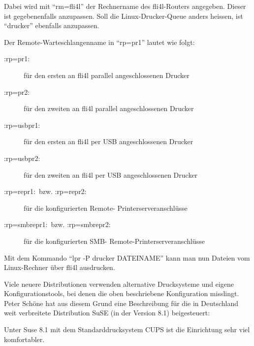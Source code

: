     Dabei wird mit ``rm=fli4l'' der Rechnername des fli4l-Routers angegeben.
    Dieser ist gegebenenfalls anzupassen. Soll die Linux-Drucker-Queue anders
    heissen, ist ``drucker'' ebenfalls anzupassen.

    Der Remote-Warteschlangenname in ``rp=pr1'' lautet wie folgt:

    \begin{description}
    \item[:rp=pr1:\ ] für den ersten an fli4l parallel angeschlossenen Drucker
    \item[:rp=pr2:\ ] für den zweiten an fli4l parallel angeschlossenen Drucker

    \item[:rp=usbpr1:\ ] für den ersten an fli4l per USB angeschlossenen Drucker
    \item[:rp=usbpr2:\ ] für den zweiten an fli4l per USB angeschlossenen Drucker

    \item[:rp=repr1:\ bzw. :rp=repr2:\ ] für die konfigurierten Remote-
    Printerserveranschlüsse

    \item[:rp=smbrepr1:\ bzw. :rp=smbrepr2:\ ] für die konfigurierten SMB-
    Remote-Printerserveranschlüsse

    \end{description}



    Mit dem Kommando ``lpr -P drucker DATEINAME'' kann man nun
    Dateien vom Linux-Rechner über fli4l ausdrucken.

Viele neuere Distributionen verwenden alternative Drucksysteme und eigene
Konfigurationstools, bei denen die oben beschriebene Konfiguration misslingt.
Peter Schöne hat aus diesem Grund eine Beschreibung für die in Deutschland weit
verbreitete Distribution SuSE (in der Version 8.1) beigesteuert:

Unter Suse 8.1 mit dem Standarddrucksystem CUPS ist die Einrichtung sehr viel
komfortabler.

